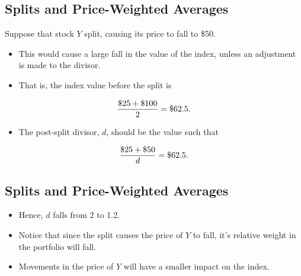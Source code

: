 \documentclass[letterpaper,10pt,english]{sphinxmanual}
\begin{document}
\subsection{Splits and Price-Weighted Averages}
\label{indexes:splits-and-price-weighted-averages}
Suppose that stock $Y$ split, causing its price to fall to \$50.
\begin{itemize}
\item {} 
This would cause a large fall in the value of the index, unless an
adjustment is made to the divisor.

\end{itemize}
\begin{itemize}
\item {} 
That is, the index value before the split is

\end{itemize}
\begin{gather}
\begin{split}\frac{\$25 + \$100}{2} = \$62.5.\end{split}\notag
\end{gather}\begin{itemize}
\item {} 
The post-split divisor, $d$, should be the value such that

\end{itemize}
\begin{gather}
\begin{split}\frac{\$25 + \$50}{d} = \$62.5.\end{split}\notag
\end{gather}

\subsection{Splits and Price-Weighted Averages}
\label{indexes:id4}\begin{itemize}
\item {} 
Hence, $d$ falls from 2 to 1.2.

\end{itemize}
\begin{itemize}
\item {} 
Notice that since the split causes the price of $Y$ to fall,
it's relative weight in the portfolio will fall.

\end{itemize}
\begin{itemize}
\item {} 
Movements in the price of $Y$ will have a smaller impact on
the index.

\end{itemize}
\end{document}
